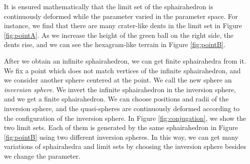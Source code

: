 \noindent
It is ensured mathematically that the limit set of the
sphairahedron is continuously deformed while the parameter varied
in the parameter space.
For instance, we find that there are many crater-like dents in the limit
set in Figure \ref{fig:pointA}.
As we increase the height of the green ball on the right side, the dents
rise, and we can see the hexagram-like terrain in Figure
\ref{fig:pointB}.

After we obtain an infinite sphairahedron, we can get
finite sphairahedra from it.
We fix a point which does not match vertices of the infinite
sphairahedron, and we consider another sphere centered at the point.
We call the new sphere an \textit{inversion sphere}.
We invert the infinite sphairahedron in the inversion sphere, and we get
a finite sphairahedron.
We can choose positions and radii of the inversion sphere, and
the quasi-spheres are continuously deformed according to the
configuration of the inversion sphere.
In Figure \ref{fig:conjugation}, we show the two limit sets.
Each of them is generated by the same sphairahedron in Figure
\ref{fig:pointB} using two different inversion spheres.
In this way, we can get many variations of sphairahedra and limit sets
by choosing the inversion sphere besides we change the parameter.


